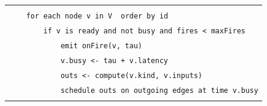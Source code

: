 \documentclass[
]{article}
\newcommand{\passthrough}[1]{#1}
\begin{document}
{\begin{longtable}[]{@{}
  >{\raggedright\arraybackslash}p{}@{}}
\begin{minipage}[t]{\linewidth}
\passthrough{\lstinline!    !}\passthrough{\lstinline!fires!}\passthrough{\lstinline! !}\passthrough{\lstinline!<-!}\passthrough{\lstinline! !}\passthrough{\lstinline!0!}\strut \\
\passthrough{\lstinline!    !}\passthrough{\lstinline!for!}\passthrough{\lstinline! !}\passthrough{\lstinline!each!}\passthrough{\lstinline! !}\passthrough{\lstinline!node!}\passthrough{\lstinline! !}\passthrough{\lstinline!v!}\passthrough{\lstinline! !}\passthrough{\lstinline!in!}\passthrough{\lstinline! !}\passthrough{\lstinline!V!}\passthrough{\lstinline!  !}\passthrough{\lstinline!order!}\passthrough{\lstinline! !}\passthrough{\lstinline!by!}\passthrough{\lstinline! !}\passthrough{\lstinline!id!}\strut \\
\passthrough{\lstinline!        !}\passthrough{\lstinline!if!}\passthrough{\lstinline! !}\passthrough{\lstinline!v!}\passthrough{\lstinline! !}\passthrough{\lstinline!is!}\passthrough{\lstinline! !}\passthrough{\lstinline!ready!}\passthrough{\lstinline! !}\passthrough{\lstinline!and!}\passthrough{\lstinline! !}\passthrough{\lstinline!not!}\passthrough{\lstinline! !}\passthrough{\lstinline!busy!}\passthrough{\lstinline! !}\passthrough{\lstinline!and!}\passthrough{\lstinline! !}\passthrough{\lstinline!fires!}\passthrough{\lstinline! !}\passthrough{\lstinline!<!}\passthrough{\lstinline! !}\passthrough{\lstinline!maxFires!}\strut \\
\passthrough{\lstinline!            !}\passthrough{\lstinline!emit!}\passthrough{\lstinline! !}\passthrough{\lstinline!onFire!}\passthrough{\lstinline!(v,!}\passthrough{\lstinline! !}\passthrough{\lstinline!tau)!}\strut \\
\passthrough{\lstinline!            !}\passthrough{\lstinline!v.busy!}\passthrough{\lstinline! !}\passthrough{\lstinline!<-!}\passthrough{\lstinline! !}\passthrough{\lstinline!tau!}\passthrough{\lstinline! !}\passthrough{\lstinline!+!}\passthrough{\lstinline! !}\passthrough{\lstinline!v.latency!}\strut \\
\passthrough{\lstinline!            !}\passthrough{\lstinline!outs!}\passthrough{\lstinline! !}\passthrough{\lstinline!<-!}\passthrough{\lstinline! !}\passthrough{\lstinline!compute(!}\passthrough{\lstinline!v.kind!}\passthrough{\lstinline!,!}\passthrough{\lstinline! !}\passthrough{\lstinline!v.inputs!}\passthrough{\lstinline!)!}\strut \\
\passthrough{\lstinline!            !}\passthrough{\lstinline!schedule!}\passthrough{\lstinline! !}\passthrough{\lstinline!outs!}\passthrough{\lstinline! !}\passthrough{\lstinline!on!}\passthrough{\lstinline! !}\passthrough{\lstinline!outgoing!}\passthrough{\lstinline! !}\passthrough{\lstinline!edges!}\passthrough{\lstinline! !}\passthrough{\lstinline!at!}\passthrough{\lstinline! !}\passthrough{\lstinline!time!}\passthrough{\lstinline! !}\passthrough{\lstinline!v.busy!}\strut \\

\end{minipage}
\end{longtable}}
\end{document}
